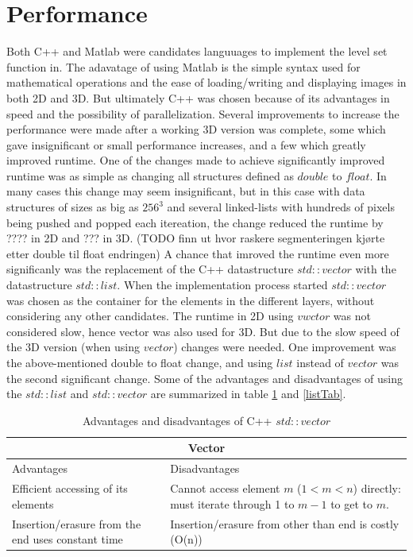 \section{Performance}
Both C++ and Matlab were candidates languuages to implement the level set function in. The adavatage of using Matlab is the simple syntax used for mathematical operations and the ease of loading/writing and displaying images in both 2D and 3D. But ultimately C++ was chosen because of its advantages in speed and the possibility of parallelization.
Several improvements to increase the performance were made after a working 3D version was complete, some which gave insignificant or small performance increases, and a few which greatly improved runtime. One of the changes made to achieve significantly improved runtime was as simple as changing all structures defined as $double$ to $float$. In many cases this change may seem insignificant, but in this case with data structures of sizes as big as $256^3$ and several linked-lists with hundreds of pixels being pushed and popped each itereation, the change reduced the runtime by ???? in 2D and ??? in 3D. (TODO finn ut hvor raskere segmenteringen kjørte etter double til float endringen) A chance that imroved the runtime even more significanly was the replacement of the C++ datastructure $std::vector$ with the datastructure $std::list$. When the implementation process started $std::vector$ was chosen as the container for the elements in the different layers, without considering any other candidates. The runtime in 2D using $vwctor$ was not considered slow, hence vector was also used for 3D. But due to the slow speed of the 3D version (when using $vector$) changes were needed. One improvement was the above-mentioned double to float change, and using $list$ instead of $vector$ was the second significant change. Some of the advantages and disadvantages of using the $std::list$ and $std::vector$ are summarized in table \ref{vectorTab} and \ref{listTab}.

\begin{table}[h!]
	\begin{tabular}{| p{5.5cm} | p{5.5cm} |} 
	\hline
	\multicolumn{2}{|c|}{Vector} \\
	\hline
	Advantages & Disadvantages \\
	\hline
	Efficient accessing of its elements & Cannot access element $m$ ($1<m<n$) directly: must iterate through 1 to $m-1$ to get to $m$. \\
	Insertion/erasure from the end uses constant time &  Insertion/erasure from other than end is costly (O(n)) \\
	\hline
	\end{tabular}
	\caption{Advantages and disadvantages of C++ $std::vector$}
	\label{vectorTab}
\end{table}

